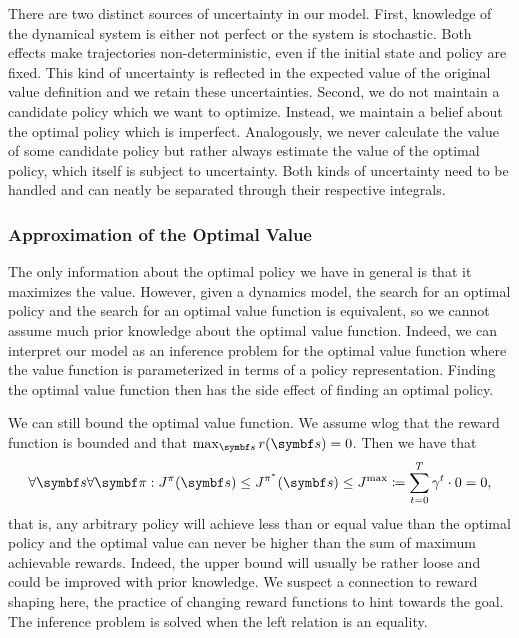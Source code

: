 There are two distinct sources of uncertainty in our model.
First, knowledge of the dynamical system is either not perfect or the system is stochastic.
Both effects make trajectories non-deterministic, even if the initial state and policy are fixed.
This kind of uncertainty is reflected in the expected value of the original value definition and we retain these uncertainties.
Second, we do not maintain a candidate policy which we want to optimize.
Instead, we maintain a belief about the optimal policy which is imperfect.
Analogously, we never calculate the value of some candidate policy but rather always estimate the value of the optimal policy, which itself is subject to uncertainty.
Both kinds of uncertainty need to be handled and can neatly be separated through their respective integrals.


\subsubsection{Approximation of the Optimal Value}
The only information about the optimal policy we have in general is that it maximizes the value.
However, given a dynamics model, the search for an optimal policy and the search for an optimal value function is equivalent, so we cannot assume much prior knowledge about the optimal value function.
Indeed, we can interpret our model as an inference problem for the optimal value function where the value function is parameterized in terms of a policy representation.
Finding the optimal value function then has the side effect of finding an optimal policy.

We can still bound the optimal value function.
We assume wlog that the reward function is bounded and that $\max_{\mat{s}} r(\mat{s}) = 0$.
Then we have that
\begin{align}
    \label{eq:inequality_chain}
    \forall \mat{s} \forall \mat{\pi} : J^\pi(\mat{s}) \leq J^{\pi^\ast}(\mat{s}) \leq J^\text{max} \coloneqq \sum_{t=0}^T \gamma^t \cdot 0 = 0,
\end{align}
that is, any arbitrary policy will achieve less than or equal value than the optimal policy and the optimal value can never be higher than the sum of maximum achievable rewards.
Indeed, the upper bound will usually be rather loose and could be improved with prior knowledge.
We suspect a connection to reward shaping here, the practice of changing reward functions to hint towards the goal.
The inference problem is solved when the left relation is an equality.


